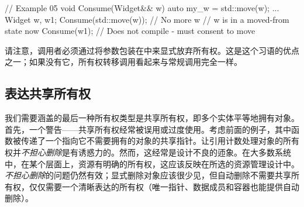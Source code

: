 \begin{code}
// Example 05
void Consume(Widget&& w) {
  auto my_w = std::move(w);
    ...
}
Widget w, w1;
Consume(std::move(w));    // No more w
// w is in a moved-from state now
Consume(w1);    // Does not compile - must consent to move
\end{code}

请注意，调用者必须通过将参数包装在中来显式放弃所有权。这是这个习语的优点之一；如果没有它，所有权转移调用看起来与常规调用完全一样。

\subsection{表达共享所有权}

我们需要涵盖的最后一种所有权类型是共享所有权，即多个实体平等地拥有对象。首先，一个警告——共享所有权经常被误用或过度使用。考虑前面的例子，其中函数被传递了一个指向它不需要拥有的对象的共享指针。让引用计数处理对象的所有权并\emph{不担心删除}是有诱惑力的。然而，这经常是设计不良的迊象。在大多数系统中，在某个层面上，资源有明确的所有权，这应该反映在所选的资源管理设计中。\emph{不担心删除}的问题仍然有效；显式删除对象应该很少见，但自动删除不需要共享所有权，仅仅需要一个清晰表达的所有权（唯一指针、数据成员和容器也能提供自动删除）。

